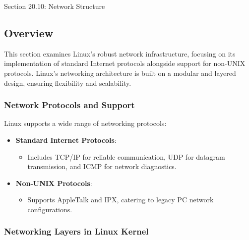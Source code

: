 \begin{notes}{Section 20.10: Network Structure}
    \subsection*{Overview}

    This section examines Linux's robust network infrastructure, focusing on its implementation of standard Internet protocols alongside support for non-UNIX protocols. Linux's networking architecture 
    is built on a modular and layered design, ensuring flexibility and scalability.
    
    \subsubsection*{Network Protocols and Support}
    
    Linux supports a wide range of networking protocols:
    \begin{itemize}
        \item \textbf{Standard Internet Protocols}:
        \begin{itemize}
            \item Includes TCP/IP for reliable communication, UDP for datagram transmission, and ICMP for network diagnostics.
        \end{itemize}
        \item \textbf{Non-UNIX Protocols}:
        \begin{itemize}
            \item Supports AppleTalk and IPX, catering to legacy PC network configurations.
        \end{itemize}
    \end{itemize}
    
    \subsubsection*{Networking Layers in Linux Kernel}
    

\end{notes}
